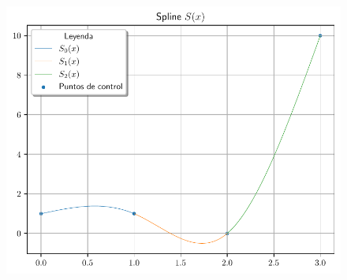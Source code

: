 \begin{frame}
    \begin{solution}
        \begin{figure}[ht!]
            \centering
            \includegraphics[width=.72\paperwidth]{p5}
        \end{figure}
    \end{solution}
\end{frame}
